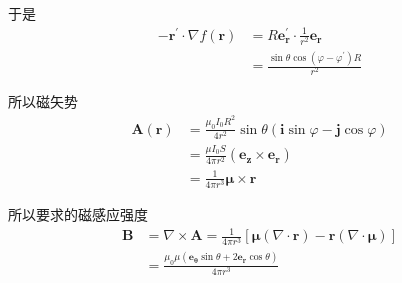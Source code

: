 \documentclass{CLGPY}
\begin{document}
\begin{multicols}{1}
于是
\begin{equation}
\begin{aligned}
-\boldsymbol{r}^{\prime} \cdot \nabla f(\boldsymbol{r})&=R \boldsymbol{e}_{\boldsymbol{r}}^{\prime} \cdot \frac{1}{r^{2}} \boldsymbol{e}_{\boldsymbol{r}}\\
&=\frac{\sin \theta \cos \left(\varphi-\varphi^{\prime}\right) R}{r^{2}}
\end{aligned}
\end{equation}

所以磁矢势
\begin{equation}
\begin{aligned}
\boldsymbol{A}(\boldsymbol{r})&=\frac{\mu_{0} I_{0} R^{2}}{4 r^{2}} \sin \theta(\bm{i} \sin \varphi-\bm{j} \cos \varphi)\\&=\frac{\mu I_0 S}{4 \pi r^{2}}\left(\bm{e_z} \times \bm{e_r}\right)\\&=\frac{1}{4 \pi {r}^{3}} \bm{\mu\times r}
\end{aligned}
\end{equation}

所以要求的磁感应强度
\begin{equation}
\begin{aligned}
\boldsymbol{B}&=\nabla \times \boldsymbol{A}=\frac{1}{4 \pi r^{3}}[\boldsymbol{\mu}(\nabla \cdot \boldsymbol{r})-\boldsymbol{r}(\nabla \cdot \boldsymbol{\mu})]\\
&=\frac{\mu_0\mu(\bm{e_\theta}\sin\theta+2\bm{e_r}\cos\theta)}{4\pi r^3}
\end{aligned}
\end{equation}


\end{multicols}
\end{document}
